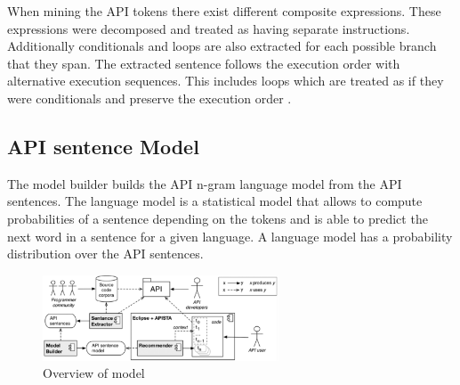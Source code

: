 When mining the API tokens there exist different composite expressions. These expressions were decomposed and treated as having separate instructions. Additionally conditionals and loops are also extracted for each possible branch that they span. The extracted sentence follows the execution order with alternative execution sequences. This includes loops which are treated as if they were conditionals and preserve the execution order \cite{Santos2017stepwise}. 

\subsection{API sentence Model}
The model builder builds the API n-gram language model from the API sentences. The language model is a statistical model that allows to compute probabilities of a sentence depending on the tokens and is able to predict the next word in a sentence for a given language. A language model has a probability distribution over the API sentences. 
\cite{Santos2017stepwise}



\begin{figure}[h]
	\centering
	\includegraphics[height=1in]{./section-chapter1/images/overview.png}
	\caption{Overview of model}
	\label{fig:overview}
\end{figure}
